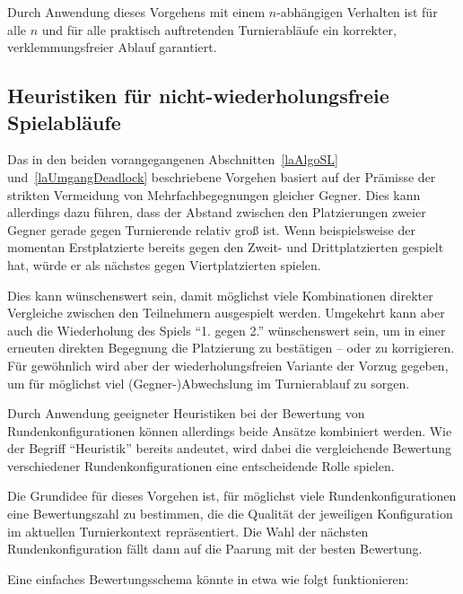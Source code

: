 \documentclass[DIV=15, 10pt]{scrartcl}
\begin{document}
Durch Anwendung dieses Vorgehens mit einem $n$-abhängigen Verhalten ist für alle $n$ und für alle praktisch auftretenden Turnierabläufe ein korrekter, verklemmungsfreier Ablauf garantiert.

\subsection{Heuristiken für nicht-wiederholungsfreie Spielabläufe}

Das in den beiden vorangegangenen Abschnitten~\ref{laAlgoSL} und~\ref{laUmgangDeadlock} beschriebene Vorgehen basiert auf der Prämisse der strikten Vermeidung von Mehrfachbegegnungen gleicher Gegner. Dies kann allerdings dazu führen, dass der Abstand zwischen den Platzierungen zweier Gegner gerade gegen Turnierende relativ groß ist. Wenn beispielsweise der momentan Erstplatzierte bereits gegen den Zweit- und Drittplatzierten gespielt hat, würde er als nächstes gegen Viertplatzierten spielen.

Dies kann wünschenswert sein, damit möglichst viele Kombinationen direkter Vergleiche zwischen den Teilnehmern ausgespielt werden. Umgekehrt kann aber auch die Wiederholung des Spiels "`1. gegen 2."' wünschenswert sein, um in einer erneuten direkten Begegnung die Platzierung zu bestätigen -- oder zu korrigieren. Für gewöhnlich wird aber der wiederholungsfreien Variante der Vorzug gegeben, um für möglichst viel (Gegner-)Abwechslung im Turnierablauf zu sorgen.

Durch Anwendung geeigneter Heuristiken bei der Bewertung von Rundenkonfigurationen können allerdings beide Ansätze kombiniert werden. Wie der Begriff "`Heuristik"' bereits andeutet, wird dabei die vergleichende Bewertung verschiedener Rundenkonfigurationen eine entscheidende Rolle spielen.

Die Grundidee für dieses Vorgehen ist, für möglichst viele Rundenkonfigurationen eine Bewertungszahl zu bestimmen, die die Qualität der jeweiligen Konfiguration im aktuellen Turnierkontext repräsentiert. Die Wahl der nächsten Rundenkonfiguration fällt dann auf die Paarung mit der besten Bewertung.

Eine einfaches Bewertungsschema könnte in etwa wie folgt funktionieren:
\end{document}
